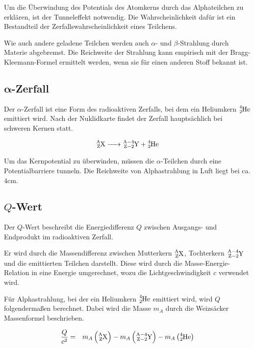 \documentclass[12pt,a4paper]{scrartcl}
\numberwithin{equation}{section} %
\newcommand{\pu}[1]{\ensuremath{\mathrm{#1}}}
\renewcommand{\[}{} %
\renewcommand{\]}{\noindent} %
\begin{document}
Um die Überwindung des Potentials des Atomkerns durch das Alphateilchen
zu erklären, ist der Tunneleffekt notwendig. Die Wahrscheinlichkeit
dafür ist ein Bestandteil der Zerfallswahrscheinlichkeit eines
Teilchens.

Wie auch andere geladene Teilchen werden auch \(\alpha\)- und
\(\beta\)-Strahlung durch Materie abgebremst. Die Reichweite der
Strahlung kann empirisch mit der Bragg-Kleemann-Formel ermittelt werden,
wenn sie für einen anderen Stoff bekannt ist.

\hypertarget{pmbalpha-zerfall}{%
\subsection{\texorpdfstring{\(\pmb{\alpha}\)-Zerfall}{\textbackslash pmb\{\textbackslash alpha\}-Zerfall}}\label{pmbalpha-zerfall}}

Der \(\alpha\)-Zerfall ist eine Form des radioaktiven Zerfalls, bei dem
ein Heliumkern \(\ce{^4_2He}\) emittiert wird. Nach der Nuklidkarte
findet der Zerfall hauptsächlich bei schweren Kernen statt.

\[
\begin{eqnarray}
        \ce{^A_ZX -> ^{A-4}_{Z-2}Y + ^4_2He}
\end{eqnarray}
\]

Um das Kernpotential zu überwinden, müssen die \(\alpha\)-Teilchen durch
eine Potentialbarriere tunneln. Die Reichweite von Alphastrahlung in
Luft liegt bei ca. \(\pu{4 cm}\).

\hypertarget{q-wert}{%
\subsection{\texorpdfstring{\(Q\)-Wert}{Q-Wert}}\label{q-wert}}

Der \(Q\)-Wert beschreibt die Energiedifferenz \(Q\) zwischen Ausgangs-
und Endprodukt im radioaktiven Zerfall.

Er wird durch die Massendifferenz zwischen Mutterkern \(\ce{^A_ZX}\),
Tochterkern \(\ce{^{A-4}_{Z-2}Y}\) und die emittierten Teilchen
darstellt. Diese wird durch die Masse-Energie-Relation in eine Energie
umgerechnet, wozu die Lichtgeschwindigkeit \(c\) verwendet wird.

Für Alphastrahlung, bei der ein Heliumkern \(\ce{^4_2He}\) emittiert
wird, wird \(Q\) folgendermaßen berechnet. Dabei wird die Masse \(m_A\)
durch die Weizsäcker Massenformel beschrieben.

\[
\begin{eqnarray}
        \frac{Q}{c^2} &=&
                m_{A}
                        \left(\ce{^A_ZX}\right)
                        - m_{A}\left(\ce{^{A-4}_{Z-2}Y}\right)
                        - m_{A}\left(\ce{^4_2He}\right)
\end{eqnarray}
\]
\end{document}

